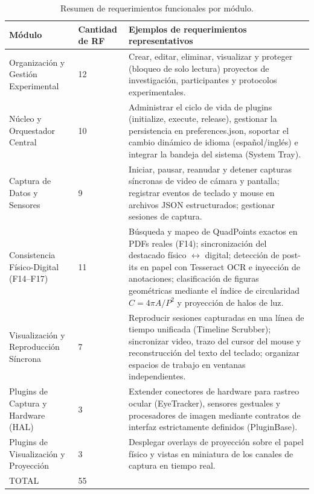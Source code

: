 \begin{table}[H]
    \centering
    \caption{Resumen de requerimientos funcionales por módulo.}
    \label{tab:rf_resumen}
    \begin{small}
    \begin{tabular}{L{3.0cm} L{1.4cm} L{9.4cm}}
        \toprule
        Módulo & Cantidad de RF & Ejemplos de requerimientos representativos \\ \midrule
        Organización y Gestión Experimental & 12 & Crear, editar, eliminar, visualizar y proteger (bloqueo de solo lectura) proyectos de investigación, participantes y protocolos experimentales. \\ \midrule
        Núcleo y Orquestador Central & 10 & Administrar el ciclo de vida de plugins (initialize, execute, release), gestionar la persistencia en preferences.json, soportar el cambio dinámico de idioma (español/inglés) e integrar la bandeja del sistema (System Tray). \\ \midrule
        Captura de Datos y Sensores & 9 & Iniciar, pausar, reanudar y detener capturas síncronas de video de cámara y pantalla; registrar eventos de teclado y mouse en archivos JSON estructurados; gestionar sesiones de captura. \\ \midrule
        Consistencia Físico-Digital (F14--F17) & 11 & Búsqueda y mapeo de QuadPoints exactos en PDFs reales (F14); sincronización del destacado físico $\leftrightarrow$ digital; detección de post-its en papel con Tesseract OCR e inyección de anotaciones; clasificación de figuras geométricas mediante el índice de circularidad $C = 4\pi A/P^{2}$ y proyección de halos de luz. \\ \midrule
        Visualización y Reproducción Síncrona & 7 & Reproducir sesiones capturadas en una línea de tiempo unificada (Timeline Scrubber); sincronizar video, trazo del cursor del mouse y reconstrucción del texto del teclado; organizar espacios de trabajo en ventanas independientes. \\ \midrule
        Plugins de Captura y Hardware (HAL) & 3 & Extender conectores de hardware para rastreo ocular (EyeTracker), sensores gestuales y procesadores de imagen mediante contratos de interfaz estrictamente definidos (PluginBase). \\ \midrule
        Plugins de Visualización y Proyección & 3 & Desplegar overlays de proyección sobre el papel físico y vistas en miniatura de los canales de captura en tiempo real. \\ \midrule
        TOTAL & 55 & \\ \bottomrule
    \end{tabular}
    \end{small}
\end{table}
 
